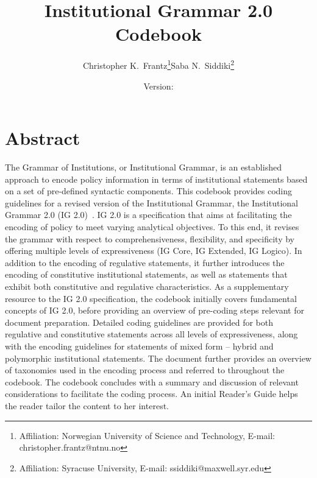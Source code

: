 \documentclass[12pt, oneside, paper=letter, DIV=15, BCOR=0mm, abstract=true, headings=small]{scrartcl}
\title{Institutional Grammar 2.0 Codebook}
\author{Christopher K.~Frantz\footnote{Affiliation: Norwegian University of Science and Technology, E-mail: christopher.frantz@ntnu.no}\qquad Saba N.~Siddiki\setcounter{footnote}{6}\footnote{Affiliation: Syracuse University, E-mail: ssiddiki@maxwell.syr.edu}}
\date{Version: \version}
\begin{document}
\maketitle

\section*{Abstract}
The Grammar of Institutions, or Institutional Grammar, is an established approach to encode policy information in terms of institutional statements based on a set of pre-defined syntactic components. This codebook provides coding guidelines for a revised version of the Institutional Grammar, the Institutional Grammar 2.0 (IG 2.0)~\citep{Frantz2021,Frantz2022InstitutionalGrammar}. IG 2.0 is a specification that aims at facilitating the encoding of policy to meet varying analytical objectives. To this end, it revises the grammar with respect to comprehensiveness, flexibility, and specificity by offering multiple levels of expressiveness (IG Core, IG Extended, IG Logico). In addition to the encoding of regulative statements, it further introduces the encoding of constitutive institutional statements, as well as statements that exhibit both constitutive and regulative characteristics. As a supplementary resource to the IG 2.0 specification, the codebook initially covers fundamental concepts of IG 2.0, before providing an overview of pre-coding steps relevant for document preparation. Detailed coding guidelines are provided for both regulative and constitutive statements across all levels of expressiveness, along with the encoding guidelines for statements of mixed form -- hybrid and polymorphic institutional statements. The document further provides an overview of taxonomies used in the encoding process and referred to throughout the codebook. The codebook concludes with a summary and discussion of relevant considerations to facilitate the coding process. An initial Reader's Guide helps the reader tailor the content to her interest.


\tableofcontents

\newpage








\printbibliography[heading=bibintoc]

\newpage

\begin{appendices}

\end{appendices}
\end{document}
